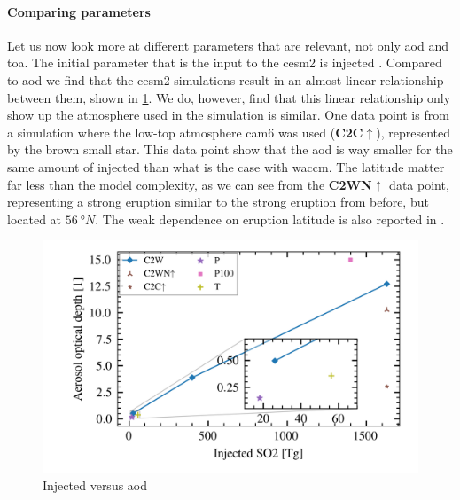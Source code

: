 \documentclass[twocol]{ametsocV5}
\begin{document}
\paragraph{Comparing parameters}

Let us now look more at different parameters that are relevant, not only \acrshort{aod}
and \acrshort{toa}. The initial parameter that is the input to the \acrshort{cesm2} is
injected . Compared to \acrshort{aod} we find that the \acrshort{cesm2}
simulations result in an almost linear relationship between them, shown in
\cref{fig:so2_vs_aod}. We do, however, find that this linear relationship only show up
the atmosphere used in the simulation is similar. One data point is from a simulation
where the low-top atmosphere \acrshort{cam6} was used (\textbf{C2C\(\uparrow\)}),
represented by the brown small star. This data point show that the \acrshort{aod} is way
smaller for the same amount of injected  than what is the case with
\acrshort{waccm}. The latitude matter far less than the model complexity, as we can see
from the \textbf{C2WN\(\uparrow\)} data point, representing a strong eruption similar to
the strong eruption from before, but located at \( \SI{56}{\degree N} \). The weak
dependence on eruption latitude is also reported in \citet{marshall2019}.

\begin{figure}
  \begin{center}
    \includegraphics[width=0.95\linewidth]{figures/injection_vs_aod.png}
  \end{center}
  \caption{Injected  versus \acrshort{aod}}%
  \label{fig:so2_vs_aod}
\end{figure}
\end{document}
